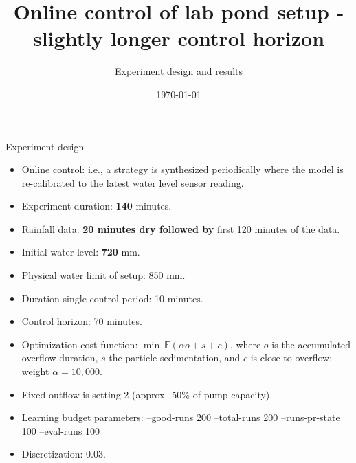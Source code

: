 \documentclass[notheorems,aspectratio=169]{beamer}
\title{Online control of lab pond setup - slightly longer control horizon}
\subtitle{Experiment design and results}
\date{\today}
\begin{document}
%
\begin{frame}
	\titlepage
\end{frame}
%

\begin{frame}{Experiment design}
	\small
	\begin{itemize}
		\item Online control: i.e., a strategy is synthesized periodically where the model is re-calibrated to the latest water level sensor reading.
		\item Experiment duration: \textbf{140} minutes.
		\item Rainfall data: \textbf{20 minutes dry followed by} first 120 minutes of the data.
		\item Initial water level: \textbf{720} mm.
		\item Physical water limit of setup: 850 mm.
		\item Duration single control period: 10 minutes.
		\item Control horizon: 70 minutes.
		\item Optimization cost function: $\min\  \mathbb{E}(\alpha o + s + c)$, where $o$ is the accumulated overflow duration, $s$ the particle sedimentation, and $c$ is close to overflow; weight $\alpha = 10,000$.
		\item Fixed outflow is setting 2 (approx.\ 50\% of pump capacity).
		\item Learning budget parameters: --good-runs 200 --total-runs 200 --runs-pr-state 100 --eval-runs 100 
		\item Discretization: 0.03.
	\end{itemize}
\end{frame}
	
\end{document}
